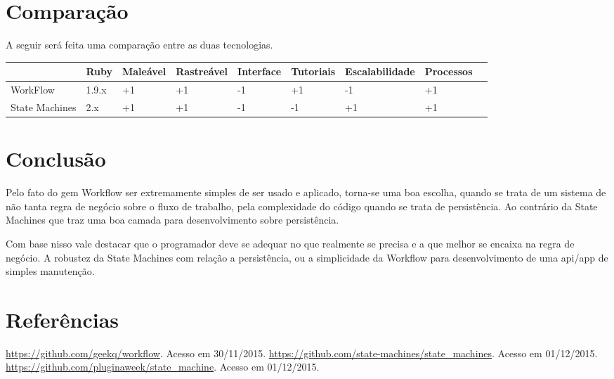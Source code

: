\documentclass[12pt, letterpaper]{article}
\begin{document}
\section{Comparação}
A seguir será feita uma comparação entre as duas tecnologias.
\begin{center}
\begin{tabular}{|l|l|l|l|l|l|l|l|l|}
\hline
               & \scriptsize{Ruby}  & \scriptsize{Maleável} & \scriptsize{Rastreável} & \scriptsize{Interface} & \scriptsize{Tutoriais} & \scriptsize{Escalabilidade} & \scriptsize{Processos} \\ \hline
\scriptsize{WorkFlow}       & 1.9.x & +1       & +1         & -1        & +1        & -1             & +1        \\ \hline
\scriptsize{State Machines} & 2.x   & +1       & +1         & -1        & -1        & +1             & +1        \\ \hline
\end{tabular}
\end{center}

\newpage
\section{Conclusão}

\par
Pelo fato do gem Workflow ser extremamente simples de ser usado e aplicado, torna-se uma boa escolha, quando se trata de um sistema de não tanta regra de negócio sobre o fluxo de trabalho, pela complexidade do código quando se trata de persistência. Ao contrário da State Machines que traz uma boa camada para desenvolvimento sobre persistência.
\par
Com base nisso vale destacar que o programador deve se adequar no que realmente se precisa e a que melhor se encaixa na regra de negócio. A robustez da State Machines com relação a persistência, ou a simplicidade da Workflow para desenvolvimento de uma api/app de simples manutenção.

\newpage
\section{Referências}

\url{https://github.com/geekq/workflow}. Acesso em 30/11/2015.\break
\url{https://github.com/state-machines/state_machines}. Acesso em 01/12/2015.\break
\url{https://github.com/pluginaweek/state_machine}. Acesso em 01/12/2015.


\end{document}
